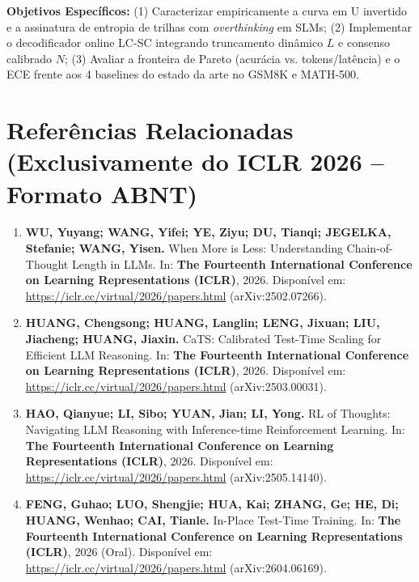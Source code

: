 \documentclass[9pt,a4paper]{extarticle}
\begin{document}
\textbf{Objetivos Específicos:} (1) Caracterizar empiricamente a curva em U invertido e a assinatura de entropia de trilhas com \textit{overthinking} em SLMs; (2) Implementar o decodificador online LC-SC integrando truncamento dinâmico $L$ e consenso calibrado $N$; (3) Avaliar a fronteira de Pareto (acurácia vs. tokens/latência) e o ECE frente aos 4 baselines do estado da arte no GSM8K e MATH-500.

\section{Referências Relacionadas (Exclusivamente do ICLR 2026 -- Formato ABNT)}
\begin{enumerate}[leftmargin=1.4em, itemsep=1.5pt, topsep=1pt]
    \item \textbf{WU, Yuyang; WANG, Yifei; YE, Ziyu; DU, Tianqi; JEGELKA, Stefanie; WANG, Yisen.} When More is Less: Understanding Chain-of-Thought Length in LLMs. In: \textbf{The Fourteenth International Conference on Learning Representations (ICLR)}, 2026. Disponível em: \url{https://iclr.cc/virtual/2026/papers.html} (arXiv:2502.07266).
    \item \textbf{HUANG, Chengsong; HUANG, Langlin; LENG, Jixuan; LIU, Jiacheng; HUANG, Jiaxin.} CaTS: Calibrated Test-Time Scaling for Efficient LLM Reasoning. In: \textbf{The Fourteenth International Conference on Learning Representations (ICLR)}, 2026. Disponível em: \url{https://iclr.cc/virtual/2026/papers.html} (arXiv:2503.00031).
    \item \textbf{HAO, Qianyue; LI, Sibo; YUAN, Jian; LI, Yong.} RL of Thoughts: Navigating LLM Reasoning with Inference-time Reinforcement Learning. In: \textbf{The Fourteenth International Conference on Learning Representations (ICLR)}, 2026. Disponível em: \url{https://iclr.cc/virtual/2026/papers.html} (arXiv:2505.14140).
    \item \textbf{FENG, Guhao; LUO, Shengjie; HUA, Kai; ZHANG, Ge; HE, Di; HUANG, Wenhao; CAI, Tianle.} In-Place Test-Time Training. In: \textbf{The Fourteenth International Conference on Learning Representations (ICLR)}, 2026 (Oral). Disponível em: \url{https://iclr.cc/virtual/2026/papers.html} (arXiv:2604.06169).
\end{enumerate}
\end{document}

